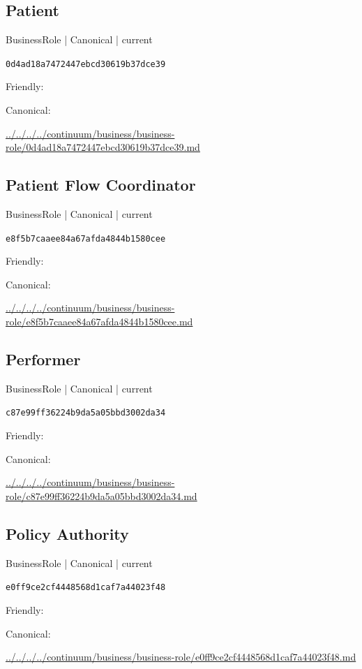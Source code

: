 \documentclass[10pt,a4paper]{article}
\begin{document}
\subsection*{Patient}
{\small BusinessRole | Canonical | current}\par
\texttt{0d4ad18a7472447ebcd30619b37dce39}\par
Friendly: \par
Canonical: \par
{\footnotesize\url{../../../../continuum/business/business-role/0d4ad18a7472447ebcd30619b37dce39.md}}\par
\subsection*{Patient Flow Coordinator}
{\small BusinessRole | Canonical | current}\par
\texttt{e8f5b7caaee84a67afda4844b1580cee}\par
Friendly: \par
Canonical: \par
{\footnotesize\url{../../../../continuum/business/business-role/e8f5b7caaee84a67afda4844b1580cee.md}}\par
\subsection*{Performer}
{\small BusinessRole | Canonical | current}\par
\texttt{c87e99ff36224b9da5a05bbd3002da34}\par
Friendly: \par
Canonical: \par
{\footnotesize\url{../../../../continuum/business/business-role/c87e99ff36224b9da5a05bbd3002da34.md}}\par
\subsection*{Policy Authority}
{\small BusinessRole | Canonical | current}\par
\texttt{e0ff9ce2cf4448568d1caf7a44023f48}\par
Friendly: \par
Canonical: \par
{\footnotesize\url{../../../../continuum/business/business-role/e0ff9ce2cf4448568d1caf7a44023f48.md}}\par
\end{document}
